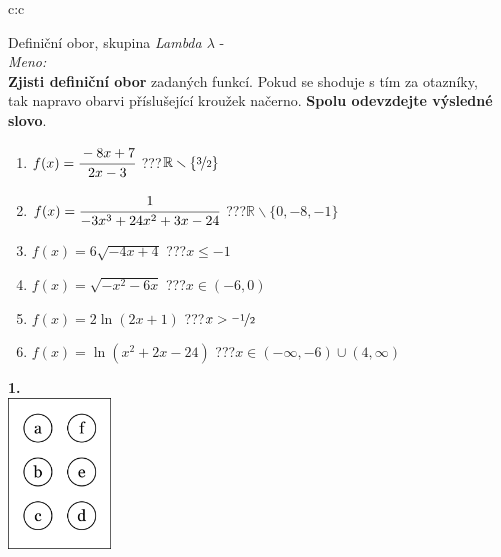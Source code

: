 \documentclass[10pt]{report}
\begin{document}
\begin{tabular}{c:c}
\begin{minipage}[c][99mm][t]{0.49\linewidth}
\begin{center}
\vspace{7mm}
{\huge Definiční obor, skupina \textit{Lambda $\lambda$} -}\\[4.5mm]
\textit{Meno:}\phantom{xxxxxxxxxxxxxxxxxxxxxxxxxxxxxxxxxxxxxxxxxxxxxxxxxxxxxxxxxxxxxxxxx}\\[3.5mm]
\textbf{Zjisti definiční obor} zadaných funkcí. Pokud se shoduje s tím za otazníky,\\tak napravo obarvi příslušející kroužek načerno. \textbf{Spolu odevzdejte výsledné slovo}.\\[3mm]
\begin{minipage}{0.77\linewidth}
\begin{center}
\begin{varwidth}{\textwidth}
\begin{enumerate}
\normalsize
\item $f(x)=\cfrac{-8x+7}{2x-3}$\quad \dotfill\; ???\;\dotfill \quad $\mathbb{R}\smallsetminus\{\nicefrac{3}{2}\}$
\item $f(x)=\cfrac{1}{-3x^3+24x^2+3x-24}$\quad \dotfill\; ???\;\dotfill \quad $\mathbb{R}\smallsetminus\{0,-8,-1\}$
\item $f(x)=6\sqrt{-4x+4}$\quad \dotfill\; ???\;\dotfill \quad $x\leq-1$
\item $f(x)=\sqrt{-x^2-6x}$\quad \dotfill\; ???\;\dotfill \quad $x\in(-6 , 0)$
\item $f(x)=2\ln{(2x+1)}$\quad \dotfill\; ???\;\dotfill \quad $x>\nicefrac{-1}{2}$
\item $f(x)=\ln{(x^2+2x-24)}$\quad \dotfill\; ???\;\dotfill \quad $x\in(-\infty , -6)\cup(4 , \infty)$
\end{enumerate}
\end{varwidth}
\end{center}
\end{minipage}
\begin{minipage}{0.20\linewidth}
\begin{center}
{\Huge\bfseries 1.} \\[2mm]
\includegraphics[height=40mm]{../images/braille.png}

\end{center}
\end{minipage}
\end{center}
\end{minipage}
\end{tabular}
\end{document}
